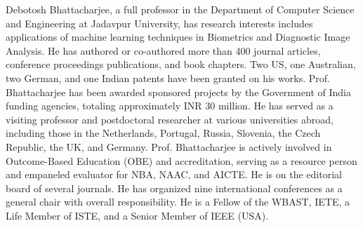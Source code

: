 {\sloppy Debotosh Bhattacharjee, a full professor in the Department of Computer Science and Engineering at Jadavpur University, has research interests includes applications of machine learning techniques in Biometrics and Diagnostic Image Analysis. He has authored or co-authored more than 400 journal articles, conference proceedings publications, and book chapters.  Two US, one Australian, two German, and one Indian patents have been granted on his works. Prof. Bhattacharjee has been awarded sponsored projects by the Government of India funding agencies, totaling approximately INR 30 million. He has served as a visiting professor and postdoctoral researcher at various universities abroad, including those in the Netherlands, Portugal, Russia, Slovenia, the Czech Republic, the UK, and Germany. Prof. Bhattacharjee is actively involved in Outcome-Based Education (OBE) and accreditation, serving as a resource person and empaneled evaluator for NBA, NAAC, and AICTE. He is on the editorial board of several journals. He has organized nine international conferences as a general chair with overall responsibility. He is a Fellow of the WBAST, IETE, a Life Member of ISTE, and a Senior Member of IEEE (USA).\par}
\endbio
